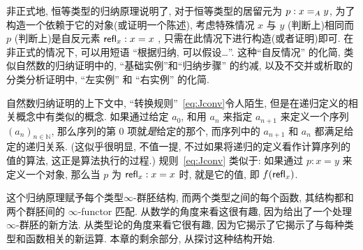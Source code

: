 非正式地, 恒等类型的归纳原理说明了, 对于恒等类型的居留元为 $p:\id[A]xy$, 为了构造一个依赖于它的对象(或证明一个陈述), 考虑特殊情况 $x$ 与 $y$ (判断上)相同而 $p$ (判断上)是自反元素 $\refl{x}:x=x$ , 只需在此情况下进行构造(或者证明)即可.
在非正式的情况下, 可以用短语 ``根据归纳, 可以假设\dots''.
这种``自反情况'' 的化简, 类似自然数的归纳证明中的, ``基础实例''和``归纳步骤'' 的约减, 以及不交并或析取的分类分析证明中, ``左实例'' 和 ``右实例'' 的化简.
%


自然数归纳证明的上下文中, ``转换规则''~\eqref{eq:Jconv}令人陌生, 但是在递归定义的相关概念中有类似的概念.
如果通过给定 $a_0$, 和用 $a_n$ 来指定 $a_{n+1}$ 来定义一个序列 $(a_n)_{n\in \mathbb{N}}$, 那么序列的第 $0$ 项就\emph{是}给定的那个, 而序列中的 $a_{n+1}$ 和 $a_n$ 都满足给定的递归关系.
(这似乎很明显, 不值一提, 不过如果将递归的定义看作计算序列的值的算法, 这正是算法执行的过程.)
规则~\eqref{eq:Jconv} 类似于: 如果通过 $p:x=y$ 来定义一个对象, 那么当 $p$ 为 $\refl{x}:x=x$ 时, 就是它的值, 即 $f(\refl{x})$.

这个归纳原理赋予每个类型$\infty$-群胚结构, 而两个类型之间的每个函数, 其结构都和两个群胚间的 $\infty$-functor
%
匹配.
从数学的角度来看这很有趣, 因为给出了一个处理 $\infty$-群胚的新方法.
从类型论的角度来看它很有趣, 因为它揭示了它揭示了与每种类型和函数相关的新运算.
本章的剩余部分, 从探讨这种结构开始.